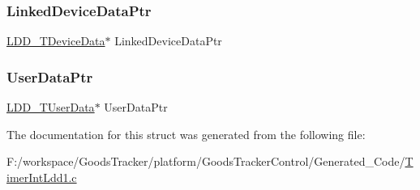 \subsubsection{\texorpdfstring{Linked\+Device\+Data\+Ptr}{LinkedDeviceDataPtr}}
{\footnotesize\ttfamily \hyperlink{group___p_e___types__module_gac5cf1362f1f0e3a2ce71b1bf2276d091}{L\+D\+D\+\_\+\+T\+Device\+Data}$\ast$ Linked\+Device\+Data\+Ptr}

\mbox{\label{struct_timer_int_ldd1___t_device_data_a8e77b9d030b00c231823350a904e0f83}} 
\subsubsection{\texorpdfstring{User\+Data\+Ptr}{UserDataPtr}}
{\footnotesize\ttfamily \hyperlink{group___p_e___types__module_ga0b66a73f87238a782318aa0be7578e35}{L\+D\+D\+\_\+\+T\+User\+Data}$\ast$ User\+Data\+Ptr}



The documentation for this struct was generated from the following file\+:\begin{DoxyCompactItemize}
\item 
F\+:/workspace/\+Goods\+Tracker/platform/\+Goods\+Tracker\+Control/\+Generated\+\_\+\+Code/\hyperlink{_timer_int_ldd1_8c}{Timer\+Int\+Ldd1.\+c}\end{DoxyCompactItemize}
